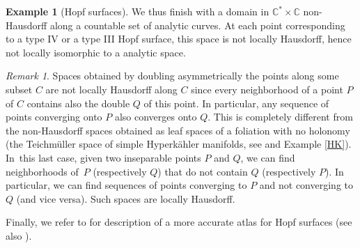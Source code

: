 \documentclass[10pt]{amsart}
\theoremstyle{plain}
\theoremstyle{definition}
\newtheorem{example}[theorem]{Example}
\theoremstyle{remark}
\newtheorem{remark}[theorem]{Remark}
\numberwithin{equation}{section}
\newcommand{\CC}{{\mathbb{C}}}
\begin{document}
\begin{example}[Hopf surfaces]
We thus finish with a domain in $\CC^*\times \CC$ non-Hausdorff along a countable set of analytic curves. At each point corresponding to a type IV or a type III Hopf surface, this space is not locally Hausdorff, hence not locally isomorphic to a analytic space.
\begin{remark}
\label{Hausdorfftypes}
Spaces obtained by doubling asymmetrically the points along some subset $C$ are not locally Hausdorff along $C$ since every neighborhood of a point $P$ of $C$ contains also the double $Q$ of this point. In particular, any sequence of points converging onto $P$ also converges onto $Q$. This is completely different from the non-Hausdorff spaces obtained as leaf spaces of a foliation with no holonomy (\cf the Teichmüller space of simple Hyperkähler manifolds, see \cite{Verbitsky} and Example \ref{HK}). In~this last case, given two inseparable points $P$ and $Q$, we can find neighborhoods of~$P$ (respectively $Q$) that do not contain $Q$ (respectively $P$). In particular, we can find sequences of points converging to $P$ and not converging to $Q$ (and vice versa). Such spaces are locally Hausdorff.
\end{remark}
\end{example}

Finally, we refer to \cite{Clement} for description of a more accurate atlas for Hopf surfaces (see also \cite{Cortona}).
\end{document}
